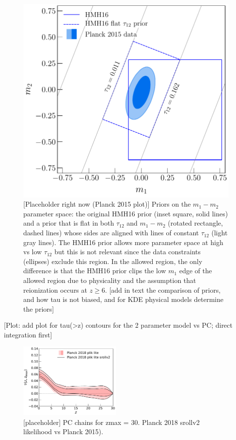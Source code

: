 \documentclass[prd,twocolumn,amsmath,amssymb,floatfix,superscriptaddress,nofootinbib]{revtex4-1}
\begin{document}
 
 \begin{figure}
          \includegraphics[width=0.9\columnwidth]{paper/plots/plot_rotated_box_flat_tau_prior_fac_0p8.pdf}
          \caption
          {[Placeholder right now (Planck 2015 plot)] Priors on the $m_1-m_2$ parameter space: the original HMH16 prior (inset square, solid lines) and a prior that is flat in
          both $\tau_{12}$ and $m_1-m_2$ (rotated rectangle, dashed lines) whose sides are aligned with lines of
          constant $\tau_{12}$ (light gray lines).   The HMH16 prior allows more parameter space at high vs low $\tau_{12}$ but this
          is not relevant since the data constraints (ellipses) exclude this region.  In the allowed region, the only difference is that the HMH16 prior clips the low $m_1$ edge of the allowed region due to physicality and the assumption that reionization occurs at
          $z\ge 6$. [add in text the comparison of priors, and how tau is not biased, and for KDE physical models determine the priors]}  \label{fig:prior_box}
\end{figure}


[Plot: add plot for tau(>z) contours for the 2 parameter model vs PC; direct integration first]

\begin{figure}[ht]
\includegraphics[width=0.45\textwidth]{results/direct_mcmc/pl18_plots_zmax30/plot_pub_tau_gtz_dz_0p1_pl18_pc_zmax30_pliklite_post_0930_and_pl18_pc_zmax30_pliklite_srollv2_0930.pdf}
\caption{[placeholder] PC chains for zmax = 30. Planck 2018 srollv2 likelihood vs Planck 2015).
}
\label{fig:}
\end{figure}
\end{document}
